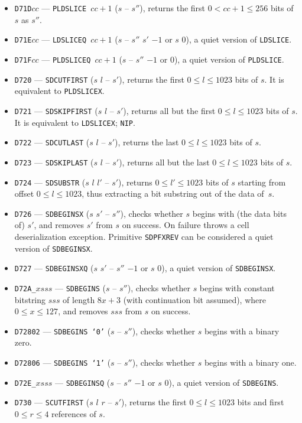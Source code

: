 \documentclass[12pt,oneside]{article}
\begin{document}
\begin{itemize}
\item {\tt D71D$cc$} --- {\tt PLDSLICE $cc+1$} ($s$ -- $s''$), returns the first $0<cc+1\leq 256$ bits of $s$ as $s''$.
\item {\tt D71E$cc$} --- {\tt LDSLICEQ $cc+1$} ($s$ -- $s''$ $s'$ $-1$ or $s$ $0$), a quiet version of {\tt LDSLICE}.
\item {\tt D71F$cc$} --- {\tt PLDSLICEQ $cc+1$} ($s$ -- $s''$ $-1$ or $0$), a quiet version of {\tt PLDSLICE}.
\item {\tt D720} --- {\tt SDCUTFIRST} ($s$ $l$ -- $s'$), returns the first $0\leq l\leq 1023$ bits of $s$. It is equivalent to {\tt PLDSLICEX}.
\item {\tt D721} --- {\tt SDSKIPFIRST} ($s$ $l$ -- $s'$), returns all but the first $0\leq l\leq 1023$ bits of $s$. It is equivalent to {\tt LDSLICEX}; {\tt NIP}.
\item {\tt D722} --- {\tt SDCUTLAST} ($s$ $l$ -- $s'$), returns the last $0\leq l\leq 1023$ bits of $s$.
\item {\tt D723} --- {\tt SDSKIPLAST} ($s$ $l$ -- $s'$), returns all but the last $0\leq l\leq 1023$ bits of $s$.
\item {\tt D724} --- {\tt SDSUBSTR} ($s$ $l$ $l'$ -- $s'$), returns $0\leq l'\leq 1023$ bits of $s$ starting from offset $0\leq l\leq 1023$, thus extracting a bit substring out of the data of~$s$.
\item {\tt D726} --- {\tt SDBEGINSX} ($s$ $s'$ -- $s''$), checks whether $s$ begins with (the data bits of) $s'$, and removes $s'$ from $s$ on success. On failure throws a cell deserialization exception. Primitive {\tt SDPFXREV} can be considered a quiet version of {\tt SDBEGINSX}.
\item {\tt D727} --- {\tt SDBEGINSXQ} ($s$ $s'$ -- $s''$ $-1$ or $s$ $0$), a quiet version of {\tt SDBEGINSX}.
\item {\tt D72A\_$xsss$} --- {\tt SDBEGINS} ($s$ -- $s''$), checks whether $s$ begins with constant bitstring $sss$ of length $8x+3$ (with continuation bit assumed), where $0\leq x\leq 127$, and removes $sss$ from $s$ on success.
\item {\tt D72802} --- {\tt SDBEGINS `0'} ($s$ -- $s''$), checks whether $s$ begins with a binary zero.
\item {\tt D72806} --- {\tt SDBEGINS `1'} ($s$ -- $s''$), checks whether $s$ begins with a binary one.
\item {\tt D72E\_$xsss$} --- {\tt SDBEGINSQ} ($s$ -- $s''$ $-1$ or $s$ $0$), a quiet version of {\tt SDBEGINS}.
\item {\tt D730} --- {\tt SCUTFIRST} ($s$ $l$ $r$ -- $s'$), returns the first $0\leq l\leq 1023$ bits and first $0\leq r\leq 4$ references of $s$.

\end{itemize}
\end{document}
